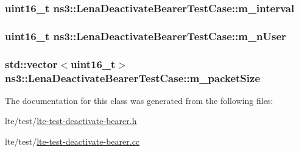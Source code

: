 \subsubsection[{\texorpdfstring{m\+\_\+interval}{m_interval}}]{\setlength{\rightskip}{0pt plus 5cm}uint16\+\_\+t ns3\+::\+Lena\+Deactivate\+Bearer\+Test\+Case\+::m\+\_\+interval\hspace{0.3cm}{\ttfamily [private]}}\hypertarget{classns3_1_1LenaDeactivateBearerTestCase_a9e0c220c5ffe150a033cff11146c620a}{}\label{classns3_1_1LenaDeactivateBearerTestCase_a9e0c220c5ffe150a033cff11146c620a}
\subsubsection[{\texorpdfstring{m\+\_\+n\+User}{m_nUser}}]{\setlength{\rightskip}{0pt plus 5cm}uint16\+\_\+t ns3\+::\+Lena\+Deactivate\+Bearer\+Test\+Case\+::m\+\_\+n\+User\hspace{0.3cm}{\ttfamily [private]}}\hypertarget{classns3_1_1LenaDeactivateBearerTestCase_a119f58840a145a5be90eef6e01784ee6}{}\label{classns3_1_1LenaDeactivateBearerTestCase_a119f58840a145a5be90eef6e01784ee6}
\subsubsection[{\texorpdfstring{m\+\_\+packet\+Size}{m_packetSize}}]{\setlength{\rightskip}{0pt plus 5cm}std\+::vector$<$uint16\+\_\+t$>$ ns3\+::\+Lena\+Deactivate\+Bearer\+Test\+Case\+::m\+\_\+packet\+Size\hspace{0.3cm}{\ttfamily [private]}}\hypertarget{classns3_1_1LenaDeactivateBearerTestCase_a0d6c5b51de98a92178ecaa55b4bfc9df}{}\label{classns3_1_1LenaDeactivateBearerTestCase_a0d6c5b51de98a92178ecaa55b4bfc9df}


The documentation for this class was generated from the following files\+:\begin{DoxyCompactItemize}
\item 
lte/test/\hyperlink{lte-test-deactivate-bearer_8h}{lte-\/test-\/deactivate-\/bearer.\+h}\item 
lte/test/\hyperlink{lte-test-deactivate-bearer_8cc}{lte-\/test-\/deactivate-\/bearer.\+cc}\end{DoxyCompactItemize}

